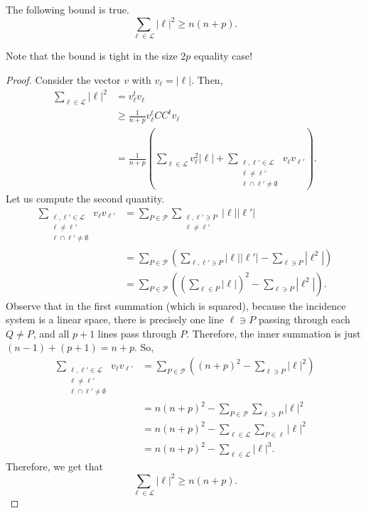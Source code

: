 \documentclass{article}
\begin{document}
	\begin{prop}
		The following bound is true.
		\[ \sum_{\ell \in \mathcal{L}} |\ell|^2 \ge n(n+p). \]
	\end{prop}
	Note that the bound is tight in the size $2p$ equality case!
	\begin{proof}
		Consider the vector $v$ with $v_{\ell} = |\ell|$. Then,
		\begin{align*}
			\sum_{\ell \in \mathcal{L}} |\ell|^2 &= v_\ell^t v_\ell \\
				&\ge \frac{1}{n+p} v_\ell^t CC^t v_\ell \\
				&= \frac{1}{n+p} \left( \sum_{\ell \in \mathcal{L}} v_\ell^2 |\ell| + \sum_{\substack{\ell,\ell' \in \mathcal{L} \\ \ell \ne \ell' \\ \ell \cap \ell' \ne \emptyset}} v_{\ell} v_{\ell'}  \right).
		\end{align*}
		Let us compute the second quantity.
		\begin{align*}
			\sum_{\substack{\ell,\ell' \in \mathcal{L} \\ \ell \ne \ell' \\ \ell \cap \ell' \ne \emptyset}} v_{\ell} v_{\ell'} &= \sum_{P \in \mathcal{P}} \sum_{\substack{\ell,\ell' \ni P \\ \ell \ne \ell'}} |\ell||\ell'| \\
				&= \sum_{P \in \mathcal{P}} \left(\sum_{\ell,\ell' \ni P} |\ell||\ell'| - \sum_{\ell \ni P} |\ell^2|\right) \\
				&= \sum_{P \in \mathcal{P}} \left( \left(\sum_{\ell \in P} |\ell|\right)^2 - \sum_{\ell \ni P} |\ell^2| \right).
		\end{align*}
		Observe that in the first summation (which is squared), because the incidence system is a linear space, there is precisely one line $\ell \ni P$ passing through each $Q \ne P$, and all $p+1$ lines pass through $P$. Therefore, the inner summation is just $(n-1)+(p+1) = n+p$. So,
		\begin{align*}
			\sum_{\substack{\ell,\ell' \in \mathcal{L} \\ \ell \ne \ell' \\ \ell \cap \ell' \ne \emptyset}} v_{\ell} v_{\ell'} &= \sum_{P \in \mathcal{P}} \left( (n+p)^2 - \sum_{\ell \ni P} |\ell|^2 \right) \\
				&= n(n+p)^2 - \sum_{P \in \mathcal{P}} \sum_{\ell \ni P} |\ell|^2 \\
				&= n(n+p)^2 - \sum_{\ell \in \mathcal{L}} \sum_{P \in \ell} |\ell|^2 \\
				&= n(n+p)^2 - \sum_{\ell \in \mathcal{L}} |\ell|^3.
		\end{align*}
		Therefore, we get that
		\[ \sum_{\ell \in \mathcal{L}} |\ell|^2 \ge n(n+p). \]
	\end{proof}
\end{document}
